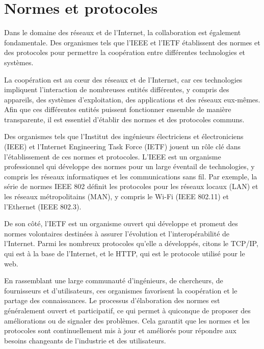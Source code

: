 \section{Normes et protocoles} 
Dans le domaine des réseaux et de l'Internet, la collaboration est également fondamentale. Des organismes tels que l'IEEE et l'IETF établissent des normes et des protocoles pour permettre la coopération entre différentes technologies et systèmes.

La coopération est au cœur des réseaux et de l'Internet, car ces technologies impliquent l'interaction de nombreuses entités différentes, y compris des appareils, des systèmes d'exploitation, des applications et des réseaux eux-mêmes. Afin que ces différentes entités puissent fonctionner ensemble de manière transparente, il est essentiel d'établir des normes et des protocoles communs.

Des organismes tels que l'Institut des ingénieurs électriciens et électroniciens (IEEE)\cite{IEEE} et l'Internet Engineering Task Force (IETF)\cite{IETF} jouent un rôle clé dans l'établissement de ces normes et protocoles. L'IEEE est un organisme professionnel qui développe des normes pour un large éventail de technologies, y compris les réseaux informatiques et les communications sans fil. Par exemple, la série de normes IEEE 802\cite{IEEE802} définit les protocoles pour les réseaux locaux (LAN) et les réseaux métropolitains (MAN), y compris le Wi-Fi (IEEE 802.11) et l'Ethernet (IEEE 802.3).

De son côté, l'IETF est un organisme ouvert qui développe et promeut des normes volontaires destinées à assurer l'évolution et l'interopérabilité de l'Internet. Parmi les nombreux protocoles qu'elle a développés, citons le TCP/IP\cite{TCPIP}, qui est à la base de l'Internet, et le HTTP\cite{HTTP}, qui est le protocole utilisé pour le web.

En rassemblant une large communauté d'ingénieurs, de chercheurs, de fournisseurs et d'utilisateurs, ces organismes favorisent la coopération et le partage des connaissances. Le processus d'élaboration des normes est généralement ouvert et participatif, ce qui permet à quiconque de proposer des améliorations ou de signaler des problèmes. Cela garantit que les normes et les protocoles sont continuellement mis à jour et améliorés pour répondre aux besoins changeants de l'industrie et des utilisateurs.

